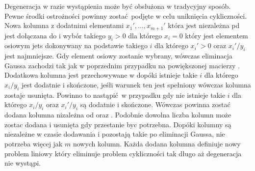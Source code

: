\begin{enumerate}
Degeneracja w razie wystąpienia może być obsłużona w tradycyjny sposób. Pewne środki ostrożności powinny zostać podjęte w celu uniknięcia cykliczności. Nowa kolumna  z dodatnimi elementami $x_1',\dots,x_{m+1}'$ która jest niezależna pd  jest dołączana do  i wybór takiego $y_i > 0$ dla którego $x_i = 0$ który jest elementem osiowym jets dokonywany na podstawie takiego $i$ dla którego $x_i' > 0$ oraz $x_i'/y_i$ jest najmniejsze. Gdy element osiowy zostanie wybrany, wówczas eliminacja Gaussa zachodzi tak jak w poprzednim przypadku na powiększonej macierzy . Dodatkowa kolumna jest przechowywane w  dopóki istnieje takie $i$ dla którego $x_i/y_i$ jest dodatnie i skończone, jeśłi warunek ten jest spełniony wówczas kolumna zostaje usunięta. Powinno to nastąpić w przypadku gdy nie istnieje takie $i$ dla którego $x_i/y_i$ oraz $x_i'/y_i$ są dodatnie i skończone. Wówczas powinna zostać dodana kolumna  nizależna od  oraz . Podobnie dowolna liczba kolumn może zostac dodana i usunięta gdy przestanie byc potrzebna. Dopóki kolumny są niezależne w czasie dodawania i pozostają takie po eliminacji Gaussa, nie potrzeba więcej jak $m$ nowych kolumn. Każda dodana kolumna definiuje nowy problem liniowy który eliminuje problem cykliczności tak długo aż degeneracja nie wystąpi.

\end{enumerate}

